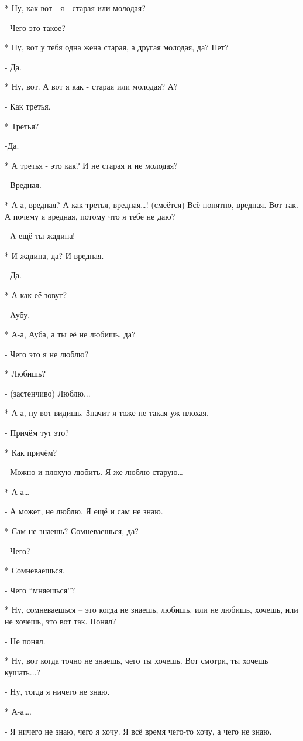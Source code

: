 * Ну, как вот - я - старая или молодая?

- Чего это такое?

* Ну, вот у тебя одна жена старая, а другая молодая, да? Нет?

- Да.

* Ну, вот. А вот я как - старая или молодая? А?

-  Как третья.

* Третья? 

-Да.

* А третья - это как? И не старая и не молодая?

- Вредная.

* А-а, вредная? А как третья, вредная…! (смеётся) Всё понятно, вредная. Вот так. А почему я вредная, потому что я тебе не даю?

- А ещё ты жадина!

* И жадина, да? И вредная.

- Да.

* А как её зовут?

- Аубу.

* А-а, Ауба, а ты её не любишь, да?

- Чего это я не люблю?

* Любишь?

- (застенчиво) Люблю...

* А-а, ну вот видишь. Значит я тоже не такая уж плохая.

- Причём тут это?

* Как причём?

- Можно и плохую любить. Я же люблю старую…

 * А-а…

- А может, не люблю. Я ещё и сам не знаю.

* Сам не знаешь? Сомневаешься, да?

- Чего?

* Сомневаешься.

- Чего “мняешься”?

* Ну, сомневаешься – это когда не знаешь, любишь, или не любишь, хочешь, или не хочешь, это вот так. Понял?

- Не понял.

* Ну, вот когда точно не знаешь, чего ты хочешь. Вот смотри, ты хочешь кушать...?

- Ну, тогда я ничего не знаю.

* А-а….

- Я ничего не знаю, чего я хочу. Я всё время чего-то хочу, а чего не знаю.

